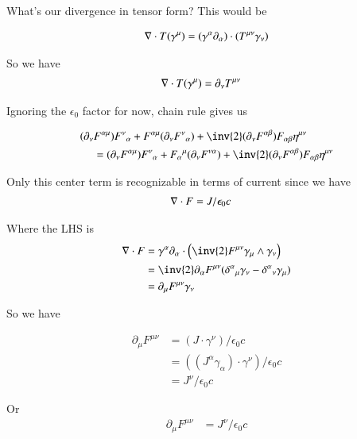 \documentclass{article}
\begin{document}
What's our divergence in tensor form?  This would be

\begin{align*}
\nabla \cdot T(\gamma^\mu)
&= (\gamma^\alpha \partial_\alpha ) \cdot (T^{\mu\nu} \gamma_\nu) \\
\end{align*}

So we have
\begin{align}
\nabla \cdot T(\gamma^\mu)
&= \partial_\nu T^{\mu\nu}
\end{align}

Ignoring the $\epsilon_0$ factor for now, chain rule gives us

\begin{align*}
(\partial_\nu &F^{\alpha\mu}) {F^{\nu}}_{\alpha} + 
F^{\alpha\mu} (\partial_\nu {F^{\nu}}_{\alpha}) + 
\inv{2} (\partial_\nu F^{\alpha\beta}) F_{\alpha\beta} \eta^{\mu\nu} \\
&=
(\partial_\nu F^{\alpha\mu}) {F^{\nu}}_{\alpha} + 
{F_{\alpha}}^{\mu} 
(\partial_\nu F^{\nu\alpha}) + 
\inv{2} (\partial_\nu F^{\alpha\beta}) F_{\alpha\beta} \eta^{\mu\nu} 
\end{align*}

Only this center term is recognizable in terms of current since we
have
\begin{align*}
\nabla \cdot F &= J/\epsilon_0 c
\end{align*}

Where the LHS is
\begin{align*}
\grad \cdot F 
&= \gamma^\alpha \partial_\alpha \cdot \left( \inv{2} F^{\mu\nu} \gamma_\mu \wedge \gamma_\nu \right) \\
&= \inv{2} \partial_\alpha F^{\mu\nu} ( {\delta^\alpha}_\mu \gamma_\nu -{\delta^\alpha}_\nu \gamma_\mu ) \\
&= \partial_\mu F^{\mu\nu} \gamma_\nu
\end{align*}

So we have

\begin{align*}
\partial_\mu F^{\mu\nu} 
&= (J \cdot \gamma^\nu)/\epsilon_0 c \\
&= ((J^\alpha \gamma_\alpha) \cdot \gamma^\nu)/\epsilon_0 c \\
&= J^\nu/\epsilon_0 c
\end{align*}

Or
\begin{align}
\partial_\mu F^{\mu\nu} &= J^\nu/\epsilon_0 c
\end{align}
\end{document}
